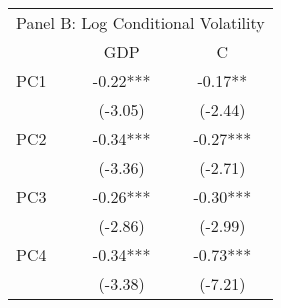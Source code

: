 \begingroup
\fontsize{12.0pt}{14.4pt}\selectfont
\begin{tabular}{lcc}
\toprule
\multicolumn{3}{c}{Panel B: Log Conditional Volatility} \\ 
\cmidrule(lr){1-3}
  & GDP & C \\ 
\midrule\addlinespace[2.5pt]
PC1 & -0.22*** & -0.17** \\ 
 & (-3.05) & (-2.44) \\ 
PC2 & -0.34*** & -0.27*** \\ 
 & (-3.36) & (-2.71) \\ 
PC3 & -0.26*** & -0.30*** \\ 
 & (-2.86) & (-2.99) \\ 
PC4 & -0.34*** & -0.73*** \\ 
 & (-3.38) & (-7.21) \\ 
\bottomrule
\end{tabular}
\endgroup

